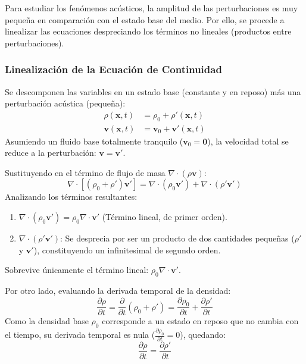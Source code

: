 \documentclass[11pt,letterpaper]{article}
\begin{document}
Para estudiar los fenómenos acústicos, la amplitud de las perturbaciones es muy pequeña en comparación con el estado base del medio. Por ello, se procede a linealizar las ecuaciones despreciando los términos no lineales (productos entre perturbaciones).

\subsubsection{Linealización de la Ecuación de Continuidad}
Se descomponen las variables en un estado base (constante y en reposo) más una perturbación acústica (pequeña):
\begin{align}
    \rho(\mathbf{x}, t) &= \rho_0 + \rho'(\mathbf{x}, t) \\
    \mathbf{v}(\mathbf{x}, t) &= \mathbf{v}_0 + \mathbf{v}'(\mathbf{x}, t)
\end{align}
Asumiendo un fluido base totalmente tranquilo ($\mathbf{v}_0 = \mathbf{0}$), la velocidad total se reduce a la perturbación: $\mathbf{v} = \mathbf{v}'$.

Sustituyendo en el término de flujo de masa $\nabla \cdot (\rho \mathbf{v})$:
\begin{equation}
    \nabla \cdot \left[ (\rho_0 + \rho') \mathbf{v}' \right] = \nabla \cdot (\rho_0 \mathbf{v}') + \nabla \cdot (\rho' \mathbf{v}')
\end{equation}
Analizando los términos resultantes:
\begin{enumerate}
    \item $\nabla \cdot (\rho_0 \mathbf{v}') = \rho_0 \nabla \cdot \mathbf{v}'$ (Término lineal, de primer orden).
    \item $\nabla \cdot (\rho' \mathbf{v}')$: Se desprecia por ser un producto de dos cantidades pequeñas ($\rho'$ y $\mathbf{v}'$), constituyendo un infinitesimal de segundo orden.
\end{enumerate}
Sobrevive únicamente el término lineal: $\rho_0 \nabla \cdot \mathbf{v}'$.

Por otro lado, evaluando la derivada temporal de la densidad:
\begin{equation}
    \frac{\partial \rho}{\partial t} = \frac{\partial}{\partial t}(\rho_0 + \rho') = \frac{\partial \rho_0}{\partial t} + \frac{\partial \rho'}{\partial t}
\end{equation}
Como la densidad base $\rho_0$ corresponde a un estado en reposo que no cambia con el tiempo, su derivada temporal es nula ($\frac{\partial \rho_0}{\partial t} = 0$), quedando:
\begin{equation}
    \frac{\partial \rho}{\partial t} = \frac{\partial \rho'}{\partial t}
\end{equation}
\end{document}
